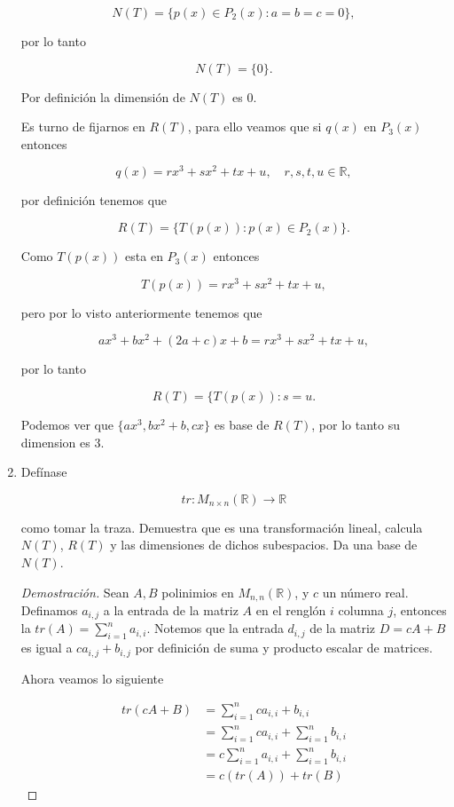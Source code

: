 \documentclass[10pt,a4paper]{article}
\theoremstyle{definition}
\newcommand{\R}{\mathbb{R}}
\begin{document}
\begin{enumerate}
    \[N(T) = \{p(x) \in P_2(x) : a = b = c = 0\},\]

    por lo tanto

    \[N(T) = \{0\}.\]

    Por definición la dimensión de $N(T)$ es 0.

    Es turno de fijarnos en $R(T)$, para ello veamos que si $q(x)$ en $P_3(x)$ entonces

    \[q(x) = rx^3 + sx^2 + tx + u, \quad r,s,t,u \in \R,\]
    
    por definición tenemos que

    \[R(T) = \{T(p(x)) : p(x) \in P_2(x)\}.\]

    Como $T(p(x))$ esta en $P_3(x)$ entonces

    \[T(p(x)) = rx^3 + sx^2 + tx + u,\]

    pero por lo visto anteriormente tenemos que

    \[ax^3 + bx^2 + (2a+c)x + b = rx^3 + sx^2 + tx + u,\]

    por lo tanto

    \[R(T) = \{T(p(x)) : s = u.\]

    Podemos ver que $\{ax^3,bx^2+b,cx\}$ es base de $R(T)$, por lo tanto su dimension es 3.

    \item Defínase
    
    \[tr : M_{n\times n}(\R) \longrightarrow \R\]

    como tomar la traza. Demuestra que es una transformación lineal, calcula $N(T)$, $R(T)$ y las dimensiones de dichos subespacios. Da una base de $N(T)$.

    \begin{proof}[Demostración]
        Sean $A, B$ polinimios en $M_{n,n}(\R)$, y $c$ un número real. Definamos $a_{i,j}$ a la entrada de la matriz $A$ en el renglón $i$ columna $j$, entonces la $tr(A) = \sum_{i=1}^{n} a_{i,i}$. Notemos que la entrada $d_{i,j}$ de la matriz $D = cA + B$ es igual a $ca_{i,j} + b_{i,j}$ por definición de suma y producto escalar de matrices.

        \newpage

        Ahora veamos lo siguiente
        
        \begin{align*}
            tr(cA + B) &= \sum_{i=1}^{n} ca_{i,i} + b_{i,i}\\
            &= \sum_{i=1}^{n} ca_{i,i} + \sum_{i=1}^{n} b_{i,i}\\
            &= c\sum_{i=1}^{n} a_{i,i} + \sum_{i=1}^{n} b_{i,i}\\
            &= c(tr(A)) + tr(B)
        \end{align*}
        

\end{proof}
\end{enumerate}
\end{document}
